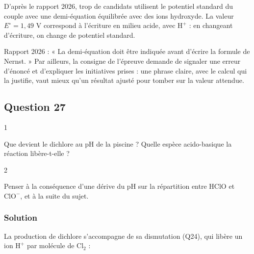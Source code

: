 \documentclass[11pt,a4paper]{article}
\newcommand{\equationajustee}[1]{%
  \sbox{\boiteequation}{$\displaystyle #1$}%
  \ifdim\wd\boiteequation>\linewidth
    \[\resizebox{\linewidth}{!}{\usebox{\boiteequation}}\]%
  \else
    \[#1\]%
  \fi}
\begin{document}
\begin{piege}

D'après le rapport 2026, trop de candidats utilisent le potentiel standard du couple avec une demi-équation équilibrée avec des ions hydroxyde. La valeur \(E^\circ=1{,}49\) V correspond à l'écriture en milieu acide, avec \(\mathrm{H^+}\) : en changeant d'écriture, on change de potentiel standard.

\end{piege}

\begin{jury}

Rapport 2026 : « La demi-équation doit être indiquée avant d'écrire la formule de Nernst. » Par ailleurs, la consigne de l'épreuve demande de signaler une erreur d'énoncé et d'expliquer les initiatives prises : une phrase claire, avec le calcul qui la justifie, vaut mieux qu'un résultat ajusté pour tomber sur la valeur attendue.

\end{jury}

\hypertarget{question-27}{%
\subsection{Question 27}\label{question-27}}

\begin{indication}{1}

Que devient le dichlore au pH de la piscine ? Quelle espèce acido-basique la réaction libère-t-elle ?

\end{indication}

\begin{indication}{2}

Penser à la conséquence d'une dérive du pH sur la répartition entre \(\mathrm{HClO}\) et \(\mathrm{ClO^-}\), et à la suite du sujet.

\end{indication}

\hypertarget{solution-26}{%
\subsubsection{Solution}\label{solution-26}}

La production de dichlore s'accompagne de sa dismutation (Q24), qui libère un ion \(\mathrm{H^+}\) par molécule de \(\mathrm{Cl_2}\) :

\equationajustee{\mathrm{Cl_2}+\mathrm{H_2O}\longrightarrow\mathrm{HClO}+\mathrm{Cl^-}+\mathrm{H^+}}
\end{document}
